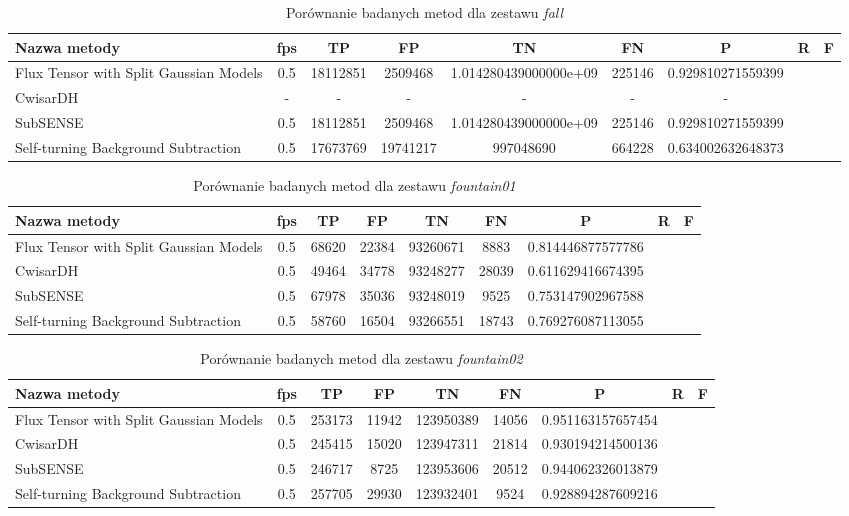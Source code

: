 \begin{table}[h]
\caption{Porównanie badanych metod dla zestawu \textit{fall}}
\label{tab:resultsFall}
\centering
\begin{tabular}{|l*{8}{|c}|}
  \hline 
  \textbf{Nazwa metody} & \textbf{fps} & \textbf{TP} & \textbf{FP} & \textbf{TN} & \textbf{FN} & \textbf{P} & \textbf{R} & \textbf{F}\\
  \hline
  Flux Tensor with Split Gaussian Models & 0.5 & 18112851 & 2509468 & 1.014280439000000e+09 & 225146 & 0.929810271559399\\
  \hline
  CwisarDH & - & - & - & - & - & -\\
  \hline
  SubSENSE & 0.5 & 18112851 & 2509468 & 1.014280439000000e+09 & 225146 & 0.929810271559399\\
  \hline
  Self-turning Background Subtraction & 0.5 & 17673769 & 19741217 & 997048690 & 664228 & 0.634002632648373\\
  \hline
\end{tabular}
\end{table}

\begin{table}[h]
\caption{Porównanie badanych metod dla zestawu \textit{fountain01}}
\label{tab:resultsFountain01}
\centering
\begin{tabular}{|l*{8}{|c}|}
  \hline 
  \textbf{Nazwa metody} & \textbf{fps} & \textbf{TP} & \textbf{FP} & \textbf{TN} & \textbf{FN} & \textbf{P} & \textbf{R} & \textbf{F}\\
  \hline
  Flux Tensor with Split Gaussian Models & 0.5 & 68620 & 22384 & 93260671 & 8883 & 0.814446877577786\\
  \hline
  CwisarDH & 0.5 & 49464 & 34778 & 93248277 & 28039 & 0.611629416674395\\
  \hline
  SubSENSE & 0.5 & 67978 & 35036 & 93248019 & 9525 & 0.753147902967588\\
  \hline
  Self-turning Background Subtraction & 0.5 & 58760 & 16504 & 93266551 & 18743 & 0.769276087113055\\
  \hline
\end{tabular}
\end{table}

\begin{table}[h]
\caption{Porównanie badanych metod dla zestawu \textit{fountain02}}
\label{tab:resultsFountain02}
\centering
\begin{tabular}{|l*{8}{|c}|}
  \hline 
  \textbf{Nazwa metody} & \textbf{fps} & \textbf{TP} & \textbf{FP} & \textbf{TN} & \textbf{FN} & \textbf{P} & \textbf{R} & \textbf{F}\\
  \hline
  Flux Tensor with Split Gaussian Models & 0.5 & 253173 & 11942 & 123950389 & 14056 & 0.951163157657454\\
  \hline
  CwisarDH & 0.5 & 245415 & 15020 & 123947311 & 21814 & 0.930194214500136\\
  \hline
  SubSENSE & 0.5 & 246717 & 8725 & 123953606 & 20512 & 0.944062326013879\\
  \hline
  Self-turning Background Subtraction & 0.5 & 257705 & 29930 & 123932401 & 9524 & 0.928894287609216\\
  \hline
\end{tabular}
\end{table}


